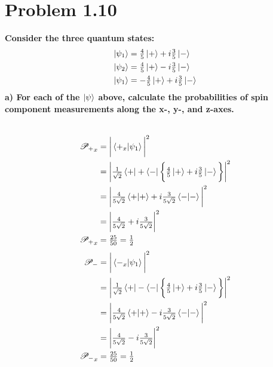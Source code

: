 \documentclass[paper=a4, fontsize=11pt]{scrartcl} %
\numberwithin{equation}{section} %
\numberwithin{figure}{section} %
\numberwithin{table}{section} %
\begin{document}
\section*{Problem 1.10}
\textbf{Consider the three quantum states:}
\begin{align*}
\ket{\psi_1} & = \tfrac{4}{5} \ket{+} + i\tfrac{3}{5} \ket{-} \\
\ket{\psi_2} & = \tfrac{4}{5} \ket{+} - i\tfrac{3}{5} \ket{-} \\
\ket{\psi_1} & = - \tfrac{4}{5} \ket{+} + i\tfrac{3}{5} \ket{-} 
\end{align*}
\textbf{a) For each of the $\ket{\psi}$ above, calculate the probabilities of spin component measurements
along the x-, y-, and z-axes.}\\
\\
 \begin{multicols}{2}
 \noindent
\begin{align*}
\mathscr{P_+}_x & = \bigg | \braket{+_x|\psi_1} \bigg|^2 \\
& = \bigg | \tfrac{1}{\sqrt{2}}\bra{+} + \bra{-} \bigg \{ \tfrac{4}{5}\ket{+} + i\tfrac{3}{5}\ket{-} \bigg \} \bigg |^2 \\
& = \bigg |  \tfrac{4}{5\sqrt{2}}\braket{+|+} + i\tfrac{3}{5\sqrt{2}} \braket{-|-}  \bigg |^2 \\
  & = \bigg |  \tfrac{4}{5\sqrt{2}} + i\tfrac{3}{5\sqrt{2}} \bigg |^2 \\
  \mathscr{P_+}_x & = \tfrac{25}{50} = \tfrac{1}{2}
  \end{align*}
   \begin{align*}
\mathscr{P_-} & = \bigg |  \braket{-_x|\psi_1} \bigg|^2 \\
& = \bigg | \tfrac{1}{\sqrt{2}} \bra{+} -\bra{-} \bigg \{ \tfrac{4}{5}\ket{+} + i\tfrac{3}{5}\ket{-} \bigg \} \bigg |^2 \\
& = \bigg |  \tfrac{4}{5\sqrt{2}}\braket{+|+} - i\tfrac{3}{5\sqrt{2}} \braket{-|-}  \bigg |^2 \\
 & = \bigg |  \tfrac{4}{5\sqrt{2}} - i\tfrac{3}{5\sqrt{2}} \bigg |^2 \\
  \mathscr{P_-}_x & = \tfrac{25}{50} = \tfrac{1}{2}
  \end{align*}
  \end{multicols}
\end{document}
